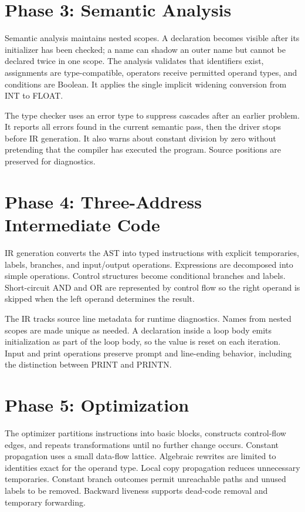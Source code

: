\documentclass[12pt,a4paper,oneside]{report}
\begin{document}
\section{Phase 3: Semantic Analysis}
Semantic analysis maintains nested scopes. A declaration becomes visible after its initializer has been checked; a name can shadow an outer name but cannot be declared twice in one scope. The analysis validates that identifiers exist, assignments are type-compatible, operators receive permitted operand types, and conditions are Boolean. It applies the single implicit widening conversion from INT to FLOAT.

The type checker uses an error type to suppress cascades after an earlier problem. It reports all errors found in the current semantic pass, then the driver stops before IR generation. It also warns about constant division by zero without pretending that the compiler has executed the program. Source positions are preserved for diagnostics.

\section{Phase 4: Three-Address Intermediate Code}
IR generation converts the AST into typed instructions with explicit temporaries, labels, branches, and input/output operations. Expressions are decomposed into simple operations. Control structures become conditional branches and labels. Short-circuit AND and OR are represented by control flow so the right operand is skipped when the left operand determines the result.

The IR tracks source line metadata for runtime diagnostics. Names from nested scopes are made unique as needed. A declaration inside a loop body emits initialization as part of the loop body, so the value is reset on each iteration. Input and print operations preserve prompt and line-ending behavior, including the distinction between PRINT and PRINTN.

\section{Phase 5: Optimization}
The optimizer partitions instructions into basic blocks, constructs control-flow edges, and repeats transformations until no further change occurs. Constant propagation uses a small data-flow lattice. Algebraic rewrites are limited to identities exact for the operand type. Local copy propagation reduces unnecessary temporaries. Constant branch outcomes permit unreachable paths and unused labels to be removed. Backward liveness supports dead-code removal and temporary forwarding.
\end{document}
